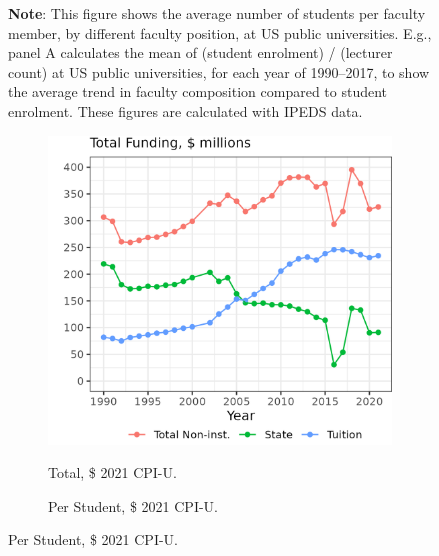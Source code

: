 \begin{figure}[H]
\begin{subfigure}[b]{0.495\textwidth}
        \label{fig:all-fte-perprof}
    \end{subfigure}
    \label{fig:fte-perprof}
    \vspace{-1cm}
    \justify
    \footnotesize
    \textbf{Note}:
    This figure shows the average number of students per faculty member, by different faculty position, at US public universities.
    E.g., panel A calculates the mean of (student enrolment) / (lecturer count) at US public universities, for each year of 1990--2017, to show the average trend in faculty composition compared to student enrolment.
    These figures are calculated with IPEDS data.
\end{figure}

\begin{figure}[H]
    \centering
    \singlespacing
    \caption{Mean Funding Sources among Illinois Public Universities, by Year.}
    \begin{subfigure}[b]{0.495\textwidth}
        \centering
        \caption{Total, \$ 2021 CPI-U.}
        \includegraphics[width=\textwidth]{figures/illinois-funding-total.png}
        \label{fig:illinois-funding-total}
    \end{subfigure}
    \begin{subfigure}[b]{0.495\textwidth}
        \centering
        \caption{Per Student, \$ 2021 CPI-U.}

\end{subfigure}
\end{figure}
